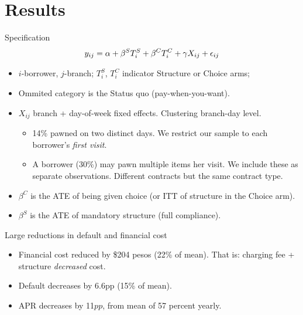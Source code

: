 \documentclass[9pt, aspectratio=169]{beamer}
\begin{document}
\section{Results}

\begin{frame}{Specification}
\begin{equation} 
\Large
    y_{ij} = \alpha + \beta^S T_{i}^S + \beta^C T_{i}^C + \gamma X_{ij} + \epsilon_{ij}
\end{equation}

\begin{itemize}
    \vfill \item $i$-borrower, $j$-branch; $T_{i}^S$, $T_{i}^C$ indicator Structure or Choice arms; 
    \vfill\item Ommited category is the Status quo (pay-when-you-want).
    \vfill\item $X_{ij}$ branch + day-of-week fixed effects. Clustering branch-day level.
    \begin{itemize}
        \item 14\% pawned on two distinct days. We restrict our sample to each borrower's \emph{first visit}.
        \item A borrower (30\%) may pawn multiple items her visit. We include these as separate observations. Different contracts but the same contract type.
    \end{itemize}
    
    \vfill \item $\beta^C$ is the ATE of being given choice (or ITT of structure in the Choice arm).
    \vfill \item   $\beta^S$ is the ATE of mandatory structure (full compliance). 
\end{itemize}
\end{frame}


\begin{frame}{Large reductions in default and financial cost}
\label{main_results}
\begin{itemize}
    \item Financial cost reduced by \$204 pesos (22\% of mean). That is: charging fee + structure \textit{decreased} cost.
    \item Default decreases by 6.6pp (15\% of mean).
    \item APR decreases by 11$pp$, from mean of 57 percent yearly.
\end{itemize}
\vspace{.3in}
\begin{table}[H]
\begin{center}
\resizebox{0.95\textwidth}{!}{
\small{}
}
\end{center}
\end{table}
   \vfill 
\end{frame}
\end{document}
